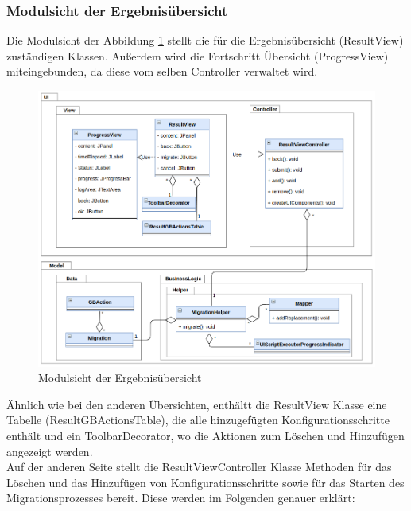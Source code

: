\subsubsection{Modulsicht der Ergebnisübersicht}
Die Modulsicht der Abbildung \ref{img:modulsicht-resul} stellt die für die Ergebnisübersicht (ResultView) zuständigen Klassen. Außerdem wird die Fortschritt Übersicht (ProgressView) miteingebunden, da diese vom selben Controller verwaltet wird.
\begin{figure}[H]
	\centering
	\includegraphics[width=\textwidth]{images/sichten/modulsicht-result}
	\caption{Modulsicht der Ergebnisübersicht}
	\label{img:modulsicht-resul}
\end{figure}
Ähnlich wie bei den anderen Übersichten, enthältt die ResultView Klasse eine Tabelle (ResultGBActionsTable), die alle hinzugefügten Konfigurationsschritte enthält und ein ToolbarDecorator, wo die Aktionen zum Löschen und Hinzufügen angezeigt werden. \\
Auf der anderen Seite stellt die ResultViewController Klasse Methoden für das Löschen und das Hinzufügen von Konfigurationsschritte sowie für das Starten des Migrationsprozesses bereit. Diese werden im Folgenden genauer erklärt:
